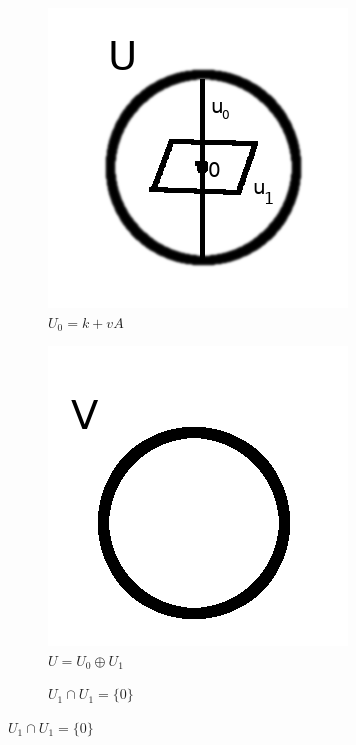 \documentclass[12pt,a4paper]{article}
\begin{document}
\begin{figure}[h]
	\centering
	\begin{subfigure}[b]{0.25\linewidth}
		\includegraphics[width=\linewidth]{1.png}
		\caption{$U_0 = k + vA$}
	\end{subfigure}
	\begin{subfigure}[b]{0.25\linewidth}
		\includegraphics[width=\linewidth]{2.png}
		\caption{$U = U_0 \oplus U_1$}
	\end{subfigure}
	\begin{subfigure}[b]{0.25\linewidth}
		\caption{$U_1 \cap U_1 = \{0\}$}
	\end{subfigure}
\end{figure}
\end{document}
